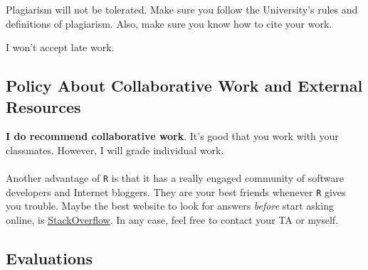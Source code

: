 \documentclass[letterpaper]{article}
\renewenvironment{itemize}{
  \begin{list}{}{
    \setlength{\leftmargin}{1.5em}
  }
}{
  \end{list}
}
\begin{document}
\begin{itemize}
  \item[{\color{red}\Pointinghand}] Plagiarism will not be tolerated. Make sure you follow the University's rules and definitions of plagiarism. Also, make sure you know how to cite your work. 

  \item[{\color{red}\Pointinghand}] I won't accept late work.

\end{itemize}


\subsection*{Policy About Collaborative Work and External Resources}

{\bf I do recommend collaborative work}. It's good that you work with your classmates. However, I will grade individual work. 
\\
\\
Another advantage of \texttt{R} is that it has a really engaged community of software developers and Internet bloggers. They are your best friends whenever \texttt{R} gives you trouble. Maybe the best website to look for answers \emph{before} start asking online, is \href{https://stackoverflow.com/questions/tagged/r}{StackOverflow}. In any case, feel free to contact your TA or myself.

\subsection*{Evaluations}
\end{document}
